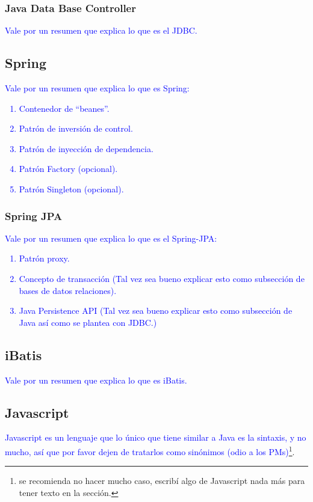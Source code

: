 \subsubsection{Java Data Base Controller}\label{sec-jdbc}
\textcolor{blue}{Vale por un resumen que explica lo que es el JDBC.}

\subsection{Spring}\label{sec-spring}
\textcolor{blue}{Vale por un resumen que explica lo que es Spring:
\begin{enumerate}
	\item Contenedor de ``beanes''.
	\item Patrón de inversión de control.
	\item Patrón de inyección de dependencia.
	\item Patrón Factory (opcional).
	\item Patrón Singleton (opcional).
\end{enumerate}
}

\subsubsection{Spring JPA}\label{sec-spring-jpa}
\textcolor{blue}{Vale por un resumen que explica lo que es el Spring-JPA:
\begin{enumerate}
	\item Patrón proxy.
	\item Concepto de transacción (Tal vez sea bueno explicar esto como subsección de bases de datos relaciones).
	\item Java Persistence API (Tal vez sea bueno explicar esto como subsección de Java así como se plantea con JDBC.)
\end{enumerate}
}

\subsection{iBatis}\label{sec-ibatis}
\textcolor{blue}{Vale por un resumen que explica lo que es iBatis.}

\subsection{Javascript}\label{sec-javascript}
\textcolor{blue}{Javascript es un lenguaje que lo único que tiene similar a Java es la sintaxis, y no mucho, así que por favor dejen de tratarlos como sinónimos (odio a los PMs)}\footnote{se recomienda no hacer mucho caso, escribí algo de Javascript nada más para tener texto en la sección.}.


